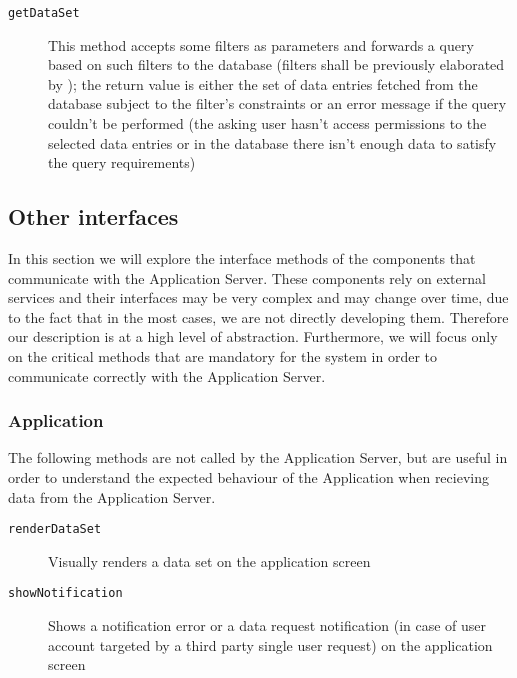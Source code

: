 \documentclass[../DD0.tex]{subfiles}
\begin{document}
      \begin{description}
        \item[\texttt{getDataSet}] This method accepts some filters as parameters and forwards a query based on such filters to the database (filters shall be previously elaborated by \FilterManager); the return value is either the set of data entries fetched from the database subject to the filter's constraints or an error message if the query couldn't be performed (the asking user hasn't access permissions to the selected data entries or in the database there isn't enough data to satisfy the query requirements)
      \end{description}

  \subsection{Other interfaces}
  \label{sec:otherinterfaces}

    In this section we will explore the interface methods of the components that communicate with the Application Server. These components rely on external services and their interfaces may be very complex and may change over time, due to the fact that in the most cases, we are not directly developing them. Therefore our description is at a high level of abstraction. Furthermore, we will focus only on the critical methods that are mandatory for the system in order to communicate correctly with the Application Server.

    \subsubsection{Application}

      The following methods are not called by the Application Server, but are useful in order to understand the expected behaviour of the Application when recieving data from the Application Server.

      \begin{description}
        \item[\texttt{renderDataSet}] Visually renders a data set on the application screen

        \item[\texttt{showNotification}] Shows a notification error or a data request notification (in case of user account targeted by a third party single user request) on the application screen
      \end{description}
\end{document}
